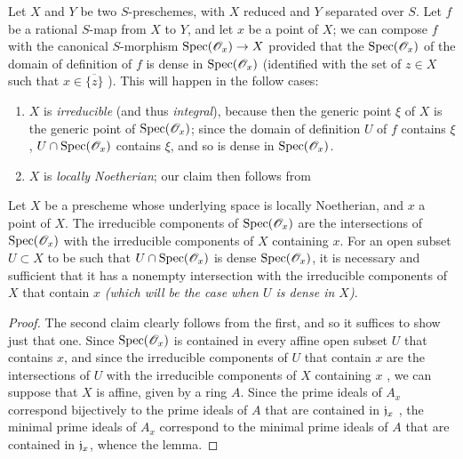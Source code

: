\begin{env}[7.2.8]
\label{1.7.2.8}
Let $X$ and $Y$ be two $S$-preschemes, with $X$ reduced and $Y$ separated over $S$.
Let $f$ be a rational $S$-map from $X$ to $Y$, and let $x$ be a point of $X$; we can compose $f$ with the canonical $S$-morphism ${\mathop{\mathrm{Spec}}\nolimits}(\mathscr{O}_x)\to X$  provided that the  ${\mathop{\mathrm{Spec}}\nolimits}(\mathscr{O}_x)$ of the domain of definition of $f$ is dense in ${\mathop{\mathrm{Spec}}\nolimits}(\mathscr{O}_x)$ (identified with the set of $z\in X$ such that $x\in\overline{\{z\}}$ ).
This will happen in the follow cases:
\begin{enumerate}
    \item $X$ is \emph{irreducible} (and thus \emph{integral}), because then the generic point $\xi$ of $X$ is the generic point of ${\mathop{\mathrm{Spec}}\nolimits}(\mathscr{O}_x)$; since the domain of definition $U$ of $f$ contains $\xi$, $U\cap{\mathop{\mathrm{Spec}}\nolimits}(\mathscr{O}_x)$ contains $\xi$, and so is dense in ${\mathop{\mathrm{Spec}}\nolimits}(\mathscr{O}_x)$.
    \item $X$ is \emph{locally Noetherian}; our claim then follows from
\end{enumerate}
\end{env}

\begin{lem}[7.2.8.1]
\label{1.7.2.8.1}
Let $X$ be a prescheme whose underlying space is locally Noetherian, and $x$ a point of $X$.
The irreducible components of ${\mathop{\mathrm{Spec}}\nolimits}(\mathscr{O}_x)$ are the intersections of ${\mathop{\mathrm{Spec}}\nolimits}(\mathscr{O}_x)$ with the irreducible components of $X$ containing $x$.
For an open subset $U\subset X$ to be such that $U\cap{\mathop{\mathrm{Spec}}\nolimits}(\mathscr{O}_x)$ is dense ${\mathop{\mathrm{Spec}}\nolimits}(\mathscr{O}_x)$, it is necessary and sufficient that it has a nonempty intersection with the irreducible components of $X$ that contain $x$ \emph{(which will be the case when $U$ is \emph{dense} in $X$)}.
\end{lem}

\begin{proof}
\label{proof-1.7.2.8.1}
The second claim clearly follows from the first, and so it suffices to show just that one.
Since ${\mathop{\mathrm{Spec}}\nolimits}(\mathscr{O}_x)$ is contained in every affine open subset $U$ that contains $x$, and since the irreducible components of $U$ that contain $x$ are the intersections of $U$ with the irreducible components of $X$ containing $x$ , we can suppose that $X$ is affine, given by a ring $A$.
Since the prime ideals of $A_x$ correspond bijectively to the prime ideals of $A$ that are contained in $\mathfrak{j}_x$ , the minimal prime ideals of $A_x$ correspond to the minimal prime ideals of $A$ that are contained in $\mathfrak{j}_x$, whence the lemma.
\end{proof}

